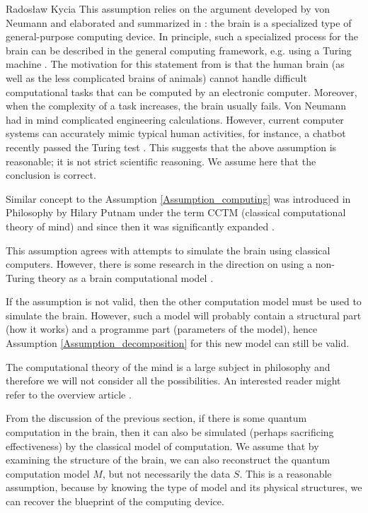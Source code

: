 \begin{artengenv}{Radosław Kycia}
This assumption relies on the argument developed by von Neumann \parencite{NeumannComputerAndTheBrain} and elaborated and summarized in \parencite{KurzweilHowToCreateBrain}: the brain is a specialized type of general-purpose computing device. In principle, such a specialized process for the brain can be described in the general computing framework, e.g. using a Turing machine \parencite{KurzweilHowToCreateBrain}. The motivation for this statement from \parencite{KurzweilHowToCreateBrain} is that the human brain (as well as the less complicated brains of animals) cannot handle difficult computational tasks that can be computed by an electronic computer. Moreover, when the complexity of a task increases, the brain usually fails. Von Neumann had in mind complicated engineering calculations. However, current computer systems can accurately mimic typical human activities, for instance, a chatbot recently passed the Turing test \parencite{PassTuringTest}. This suggests that the above assumption is reasonable; it is not strict scientific reasoning. We assume here that the conclusion is correct.

Similar concept to the Assumption \ref{Assumption_computing} was introduced in Philosophy by Hilary Putnam \parencite*{Putnam} under the term CCTM (classical computational theory of mind) and since then it was significantly expanded \parencite{StanfordEncyclopedyOfPhilosophy_ComputationalMind}.


This assumption agrees with attempts to simulate the brain using classical computers. However, there is some research in the direction on using a non-Turing theory as a brain computational model \parencite{FengComputationaNeuroscience}. 

If the assumption is not valid, then the other computation model must be used to simulate the brain. However, such a model will probably contain a structural part (how it works) and a programme part (parameters of the model), hence Assumption \ref{Assumption_decomposition} for this new model can still be valid. 

The computational theory of the mind is a large subject in philosophy and therefore we will not consider all the possibilities. An interested reader might refer to the overview article \parencite{StanfordEncyclopedyOfPhilosophy_ComputationalMind}.


From the discussion of the previous section, if there is some quantum computation in the brain, then it can also be simulated (perhaps sacrificing effectiveness) by the classical model of computation. We assume that by examining the structure of the brain, we can also reconstruct the quantum computation model $M$, but not necessarily the data $S$. This is a reasonable assumption, because by knowing the type of model and its physical structures, we can recover the blueprint of the computing device.



\end{artengenv}
